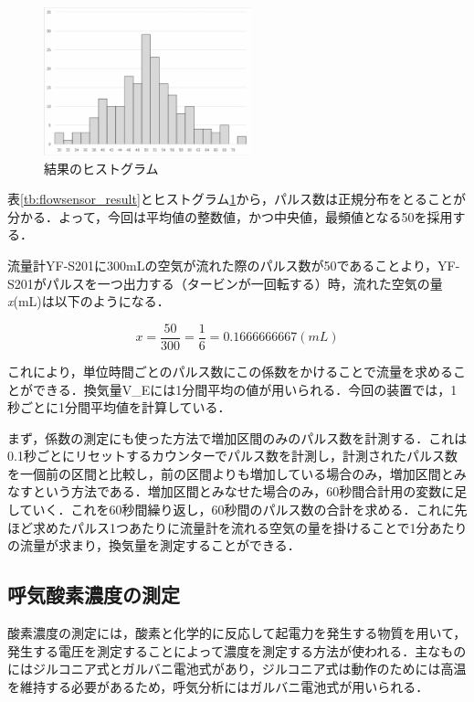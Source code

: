 \begin{figure}[H]
  \begin{center}
    \includegraphics[width=6cm]{fig/flowsensor_histogram}
    \caption{結果のヒストグラム}
    \label{fig:flowsensor_histogram}
  \end{center}
\end{figure}

表\ref{tb:flowsensor_result}とヒストグラム\ref{fig:flowsensor_histogram}から，パルス数は正規分布をとることが分かる．よって，今回は平均値の整数値，かつ中央値，最頻値となる50を採用する．

流量計YF-S201に300mLの空気が流れた際のパルス数が50であることより，YF-S201がパルスを一つ出力する（タービンが一回転する）時，流れた空気の量{\it x}(mL)は以下のようになる．

\begin{equation}
  \label{eq:pulse_per_ml}
  x = \frac{50}{300} = \frac{1}{6} = 0.1666666667 (mL)
\end{equation}

これにより，単位時間ごとのパルス数にこの係数をかけることで流量を求めることができる．換気量V_Eには1分間平均の値が用いられる．今回の装置では，1秒ごとに1分間平均値を計算している．

まず，係数の測定にも使った方法で増加区間のみのパルス数を計測する．これは0.1秒ごとにリセットするカウンターでパルス数を計測し，計測されたパルス数を一個前の区間と比較し，前の区間よりも増加している場合のみ，増加区間とみなすという方法である．増加区間とみなせた場合のみ，60秒間合計用の変数に足していく．これを60秒間繰り返し，60秒間のパルス数の合計を求める．これに先ほど求めたパルス1つあたりに流量計を流れる空気の量を掛けることで1分あたりの流量が求まり，換気量を測定することができる．

\subsection{呼気酸素濃度の測定}

酸素濃度の測定には，酸素と化学的に反応して起電力を発生する物質を用いて，発生する電圧を測定することによって濃度を測定する方法が使われる．主なものにはジルコニア式とガルバニ電池式があり，ジルコニア式は動作のためには高温を維持する必要があるため，呼気分析にはガルバニ電池式が用いられる．

